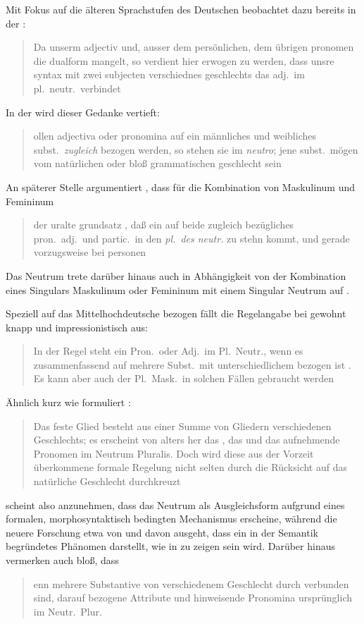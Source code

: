 Mit Fokus auf die älteren Sprachstufen des Deutschen beobachtet dazu bereits
\citeauthor{grimm1848} in der :
\blockcquote[978]{grimm1848}{Da unserm adjectiv und, ausser dem
persönlichen, dem übrigen pronomen die dualform mangelt, so verdient
hier erwogen zu werden, dass unsre syntax mit zwei subjecten verschiednes
geschlechts das adj.\ im pl.~neutr.\ verbindet}. In der  wird dieser Gedanke vertieft:
\blockcquote[311--312]{grimm1890}{ollen adjectiva oder pronomina
auf ein männliches und weibliches subst.\ \emph{zugleich} bezogen werden, so
stehen sie im \emph{neutro}; jene subst.\ mögen vom natürlichen oder bloß
grammatischen geschlecht sein}. An späterer Stelle argumentiert
\citeauthor{grimm1898}, dass für die Kombination von Maskulinum und Femininum
\blockcquote[329]{grimm1898}{der uralte grundsatz , daß ein auf
beide zugleich bezügliches pron.\ adj.\ und partic.\ in den \emph{pl.\ des
\mbox{neutr.}} zu stehn kommt, und gerade vorzugsweise bei personen}. Das
Neutrum trete darüber hinaus auch in Abhängigkeit von der Kombination eines
Singulars Maskulinum oder Femininum mit einem Singular Neutrum auf
\autocite[331]{grimm1898}.

Speziell auf das Mittelhochdeutsche bezogen fällt die
Regelangabe bei \citeauthor{paul2007} gewohnt knapp und impressionistisch aus:
\blockcquote[384]{paul2007}{In der Regel steht ein Pron.\ oder Adj.\ im
Pl.~Neutr., wenn es zusammenfassend auf mehrere Subst.\ mit unterschiedlichem
 bezogen ist \textelp{}. Es kann aber auch der Pl.~Mask.\ in solchen
Fällen gebraucht werden}. Ähnlich kurz wie \citet{paul2007} formuliert
\citet[39]{behaghel1928}: \blockquote{Das feste Glied besteht aus einer Summe
von Gliedern verschiedenen Geschlechts; es erscheint von alters her das
, das  und das aufnehmende Pronomen im Neutrum
Pluralis. \textelp{} Doch wird diese aus der Vorzeit überkommene formale
Regelung nicht selten durch die Rücksicht auf das natürliche Geschlecht
durchkreuzt}.

\citet{behaghel1928} scheint also anzunehmen, dass das Neutrum als
Ausgleichsform aufgrund eines formalen, morphosyntaktisch bedingten Mechanismus
erscheine, während die neuere Forschung etwa von \citet{wechslerzlatic2003} und
\citet{wechsler2009} davon ausgeht, dass  ein in der
Semantik begründetes Phänomen darstellt, wie in  zu
zeigen sein wird. Darüber hinaus vermerken auch \citet[188]{dal2014} bloß, dass
\blockquote{enn mehrere Substantive von
verschiedenem Geschlecht durch  verbunden sind, \textelp{}
darauf bezogene Attribute und hinweisende Pronomina ursprünglich
im Neutr.\ Plur.\ }.


